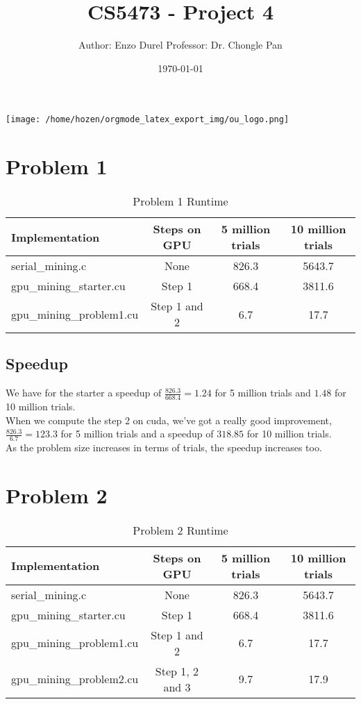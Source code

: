 \documentclass[11pt]{article}
\author{Author: Enzo Durel \newline Professor: Dr. Chongle Pan}
\date{\today}
\title{CS5473 - Project 4}
\begin{document}
\maketitle
\begin{center}
\texttt{[image: /home/hozen/orgmode\_latex\_export\_img/ou\_logo.png]}
\end{center}
\thispagestyle{empty}
\setcounter{tocdepth}{2}
\tableofcontents
\clearpage
{}
\thispagestyle{empty}
\listoftables
\clearpage
{} 
\newpage
\section{Problem 1}
\label{sec:orgf3606ac}

\begin{table}[htbp]
\caption{Problem 1 Runtime}
\centering
\begin{tabular}{|l|c|c|c|}
\hline
Implementation & Steps on GPU & 5 million trials & 10 million trials\\
\hline
serial\_mining.c & None & 826.3 & 5643.7\\
\hline
gpu\_mining\_starter.cu & Step 1 & 668.4 & 3811.6\\
\hline
gpu\_mining\_problem1.cu & Step 1 and 2 & 6.7 & 17.7\\
\hline
\end{tabular}
\end{table}
\subsection{Speedup}
\label{sec:org49a2aea}

We have for the starter a speedup of \(\frac{826.3}{668.4} = 1.24\) for 5 million trials and \(1.48\) for 10 million trials.\\

When we compute the step 2 on cuda, we've got a really good improvement, \(\frac{826.3}{6.7} = 123.3\) for 5 million trials and a speedup of \(318.85\) for 10 million trials.\\

As the problem size increases in terms of trials, the speedup increases too.
\newpage
\section{Problem 2}
\label{sec:org1f82024}

\begin{table}[htbp]
\caption{Problem 2 Runtime}
\centering
\begin{tabular}{|l|c|c|c|}
\hline
Implementation & Steps on GPU & 5 million trials & 10 million trials\\
\hline
serial\_mining.c & None & 826.3 & 5643.7\\
\hline
gpu\_mining\_starter.cu & Step 1 & 668.4 & 3811.6\\
\hline
gpu\_mining\_problem1.cu & Step 1 and 2 & 6.7 & 17.7\\
\hline
gpu\_mining\_problem2.cu & Step 1, 2 and 3 & 9.7 & 17.9\\
\hline
\end{tabular}
\end{table}
\end{document}
